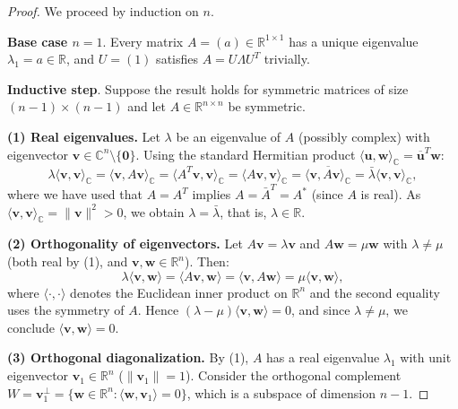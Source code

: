 \begin{proof}
	We proceed by induction on $n$.

	\textbf{Base case $n = 1$}. Every matrix $A = (a) \in \mathbb{R}^{1 \times 1}$ has a unique eigenvalue $\lambda_1 = a \in \mathbb{R}$, and $U = (1)$ satisfies $A = U \Lambda U^T$ trivially.

	\textbf{Inductive step}. Suppose the result holds for symmetric matrices of size $(n-1) \times (n-1)$ and let $A \in \mathbb{R}^{n \times n}$ be symmetric.

	\textbf{(1) Real eigenvalues.} Let $\lambda$ be an eigenvalue of $A$ (possibly complex) with eigenvector $\mathbf{v} \in \mathbb{C}^n \setminus \{\mathbf{0}\}$. Using the standard Hermitian product $\langle \mathbf{u}, \mathbf{w} \rangle_{\mathbb{C}} = \overline{\mathbf{u}}^T \mathbf{w}$:
	\[
		\lambda \langle \mathbf{v}, \mathbf{v} \rangle_{\mathbb{C}} = \langle \mathbf{v}, A\mathbf{v} \rangle_{\mathbb{C}} = \langle A^T \mathbf{v}, \mathbf{v} \rangle_{\mathbb{C}} = \langle A\mathbf{v}, \mathbf{v} \rangle_{\mathbb{C}} = \overline{\langle \mathbf{v}, A\mathbf{v} \rangle_{\mathbb{C}}} = \bar{\lambda} \langle \mathbf{v}, \mathbf{v} \rangle_{\mathbb{C}},
	\]
	where we have used that $A = A^T$ implies $A = \bar{A}^T = A^*$ (since $A$ is real). As $\langle \mathbf{v}, \mathbf{v} \rangle_{\mathbb{C}} = \|\mathbf{v}\|^2 > 0$, we obtain $\lambda = \bar{\lambda}$, that is, $\lambda \in \mathbb{R}$.

	\textbf{(2) Orthogonality of eigenvectors.} Let $A\mathbf{v} = \lambda \mathbf{v}$ and $A\mathbf{w} = \mu \mathbf{w}$ with $\lambda \neq \mu$ (both real by (1), and $\mathbf{v}, \mathbf{w} \in \mathbb{R}^n$). Then:
	\[
		\lambda \langle \mathbf{v}, \mathbf{w} \rangle = \langle A\mathbf{v}, \mathbf{w} \rangle = \langle \mathbf{v}, A\mathbf{w} \rangle = \mu \langle \mathbf{v}, \mathbf{w} \rangle,
	\]
	where $\langle \cdot, \cdot \rangle$ denotes the Euclidean inner product on $\mathbb{R}^n$ and the second equality uses the symmetry of $A$. Hence $(\lambda - \mu)\langle \mathbf{v}, \mathbf{w} \rangle = 0$, and since $\lambda \neq \mu$, we conclude $\langle \mathbf{v}, \mathbf{w} \rangle = 0$.

	\textbf{(3) Orthogonal diagonalization.} By (1), $A$ has a real eigenvalue $\lambda_1$ with unit eigenvector $\mathbf{v}_1 \in \mathbb{R}^n$ ($\|\mathbf{v}_1\| = 1$). Consider the orthogonal complement $W = \mathbf{v}_1^\perp = \{\mathbf{w} \in \mathbb{R}^n : \langle \mathbf{w}, \mathbf{v}_1 \rangle = 0\}$, which is a subspace of dimension $n - 1$.


\end{proof}
